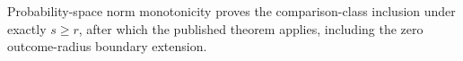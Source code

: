 Probability-space norm monotonicity proves the comparison-class inclusion under exactly \(s\ge r\), after which the published theorem applies, including the zero outcome-radius boundary extension.